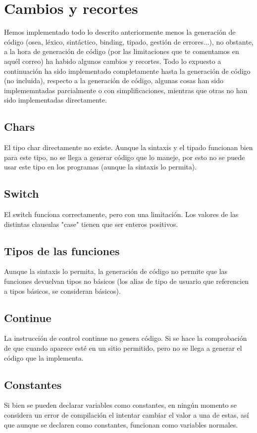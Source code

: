 \documentclass{article}
\begin{document}
\section{Cambios y recortes}
\label{r}
Hemos implementado todo lo descrito anteriormente menos la generación de código (osea, léxico, sintáctico, binding, tipado, gestión de errores...), no obstante, a la hora de generación de código (por las limitaciones que te comentamos en aquél correo) ha habido algunos cambios y recortes. Todo lo expuesto a continuación ha sido implementado completamente hasta la generación de código (no incluida), respecto a la generación de código, algunas cosas han sido implememntadas parcialmente o con simplificaciones, mientras que otras no han sido implementadas directamente.

\subsection{Chars}
El tipo char directamente no existe. Aunque la sintaxis y el tipado funcionan bien para este tipo, no se llega a generar código que lo maneje, por esto no se puede usar este tipo en los programas (aunque la sintaxis lo permita).

\subsection{Switch}
El switch funciona correctamente, pero con una limitación. Los valores de las distintas clausulas "case" tienen que ser enteros positivos.

\subsection{Tipos de las funciones}
Aunque la sintaxis lo permita, la generación de código no permite que las funciones devuelvan tipos no básicos (los alias de tipo de usuario que referencien a tipos básicos, se consideran básicos).

\subsection{Continue}
La instrucción de control continue no genera código. Si se hace la comprobación de que cuando aparece esté en un sitio permitido, pero no se llega a generar el código que la implementa.

\subsection{Constantes}
Si bien se pueden declarar variables como constantes, en ningún momento se considera un error de compilación el intentar cambiar el valor a una de estas, así que aunque se declaren como constantes, funcionan como variables normales.
\end{document}
